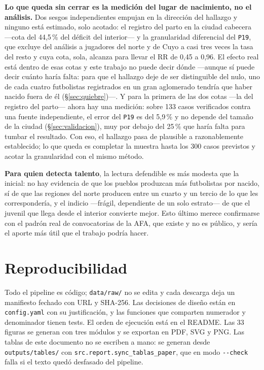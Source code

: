 \documentclass[11pt,a4paper]{article}
\begin{document}
\textbf{Lo que queda sin cerrar es la medición del lugar de nacimiento, no el
análisis.} Dos sesgos independientes empujan en la dirección del hallazgo y
ninguno está estimado, solo acotado: el registro del parto en la ciudad cabecera
—cota del 44,5\,\% del déficit del interior— y la granularidad diferencial del
\texttt{P19}, que excluye del análisis a jugadores del norte y de Cuyo a casi tres
veces la tasa del resto y cuya cota, sola, alcanza para llevar el RR de 0,45 a
0,96. El efecto real está dentro de esas cotas y este trabajo no puede decir
dónde —aunque sí puede decir cuánto haría falta: para que el hallazgo deje de ser
distinguible del nulo, uno de cada cuatro futbolistas registrados en un gran
aglomerado tendría que haber nacido fuera de él (§\ref{sec:quiebre})—. Y para la primera de las dos cotas
—la del registro del parto— ahora hay una medición: sobre 133 casos verificados
contra una fuente independiente, el error del \texttt{P19} es del 5,9\,\% y no
depende del tamaño de la ciudad (§\ref{sec:validacion}), muy por debajo del
25\,\% que haría falta para tumbar el resultado. Con eso, el hallazgo pasa de
plausible a razonablemente establecido; lo que queda es completar la muestra
hasta los 300 casos previstos y acotar la granularidad con el mismo método.

\textbf{Para quien detecta talento}, la lectura defendible es más modesta que la
inicial: no hay evidencia de que los pueblos produzcan más futbolistas por
nacido, sí de que las regiones del norte producen entre un cuarto y un tercio de
lo que les correspondería, y el indicio —frágil, dependiente de un solo estrato—
de que el juvenil que llega desde el interior convierte mejor. Esto último merece
confirmarse con el padrón real de convocatorias de la AFA, que existe y no es
público, y sería el aporte más útil que el trabajo podría hacer.

\section{Reproducibilidad}
\label{sec:repro}

Todo el pipeline es código; \texttt{data/raw/} no se edita y cada descarga deja un
manifiesto fechado con URL y SHA-256. Las decisiones de diseño están en
\texttt{config.yaml} con su justificación, y las funciones que comparten
numerador y denominador tienen tests. El orden de ejecución está en el README.
Las 33 figuras se generan con tres módulos y se exportan en PDF, SVG y PNG.
Las tablas de este documento no se escriben a mano: se generan desde
\texttt{outputs/tables/} con \texttt{src.report.sync\_tablas\_paper}, que en modo
\texttt{-{}-check} falla si el texto quedó desfasado del pipeline.
\end{document}
